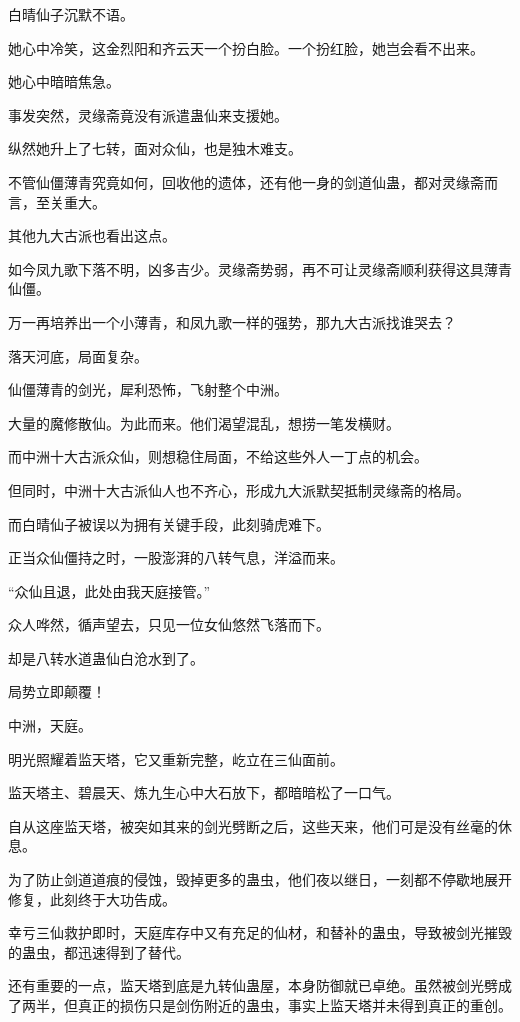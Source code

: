 \begin{this_body}
白晴仙子沉默不语。

她心中冷笑，这金烈阳和齐云天一个扮白脸。一个扮红脸，她岂会看不出来。

她心中暗暗焦急。

事发突然，灵缘斋竟没有派遣蛊仙来支援她。

纵然她升上了七转，面对众仙，也是独木难支。

不管仙僵薄青究竟如何，回收他的遗体，还有他一身的剑道仙蛊，都对灵缘斋而言，至关重大。

其他九大古派也看出这点。

如今凤九歌下落不明，凶多吉少。灵缘斋势弱，再不可让灵缘斋顺利获得这具薄青仙僵。

万一再培养出一个小薄青，和凤九歌一样的强势，那九大古派找谁哭去？

落天河底，局面复杂。

仙僵薄青的剑光，犀利恐怖，飞射整个中洲。

大量的魔修散仙。为此而来。他们渴望混乱，想捞一笔发横财。

而中洲十大古派众仙，则想稳住局面，不给这些外人一丁点的机会。

但同时，中洲十大古派仙人也不齐心，形成九大派默契抵制灵缘斋的格局。

而白晴仙子被误以为拥有关键手段，此刻骑虎难下。

正当众仙僵持之时，一股澎湃的八转气息，洋溢而来。

“众仙且退，此处由我天庭接管。”

众人哗然，循声望去，只见一位女仙悠然飞落而下。

却是八转水道蛊仙白沧水到了。

局势立即颠覆！

中洲，天庭。

明光照耀着监天塔，它又重新完整，屹立在三仙面前。

监天塔主、碧晨天、炼九生心中大石放下，都暗暗松了一口气。

自从这座监天塔，被突如其来的剑光劈断之后，这些天来，他们可是没有丝毫的休息。

为了防止剑道道痕的侵蚀，毁掉更多的蛊虫，他们夜以继日，一刻都不停歇地展开修复，此刻终于大功告成。

幸亏三仙救护即时，天庭库存中又有充足的仙材，和替补的蛊虫，导致被剑光摧毁的蛊虫，都迅速得到了替代。

还有重要的一点，监天塔到底是九转仙蛊屋，本身防御就已卓绝。虽然被剑光劈成了两半，但真正的损伤只是剑伤附近的蛊虫，事实上监天塔并未得到真正的重创。


\end{this_body}
